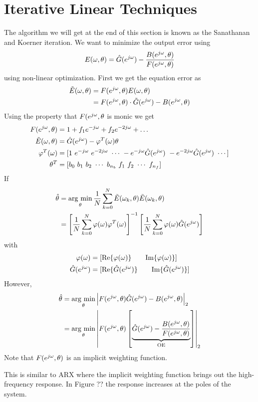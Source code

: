 \section{Iterative Linear Techniques}
The algorithm we will get at the end of this section is known as the Sanathanan and Koerner iteration. We want to minimize the output error using
$$E(\omega,\theta) = \hat{G}(e^{j\omega}) - \frac{B(e^{j\omega},\theta)}{F(e^{j\omega},\theta)}$$
using non-linear optimization. First we get the equation error as
\begin{align*}
\tilde{E}(\omega,\theta) &= F(e^{j\omega},\theta)E(\omega,\theta) \\
&= F(e^{j\omega},\theta)\cdot\tilde{G}(e^{j\omega}) - B(e^{j\omega},\theta)
\end{align*}
Using the property that $F(e^{j\omega},\theta$ is monic we get
\begin{align*}
F(e^{j\omega},\theta) &= 1 + f_1e^{-j\omega} + f_2e^{-2j\omega} + \ldots \\
\tilde{E}(\omega,\theta) &= \hat{G}(e^{j\omega}) - \varphi^T(\omega)\theta \\
\varphi^T(\omega) &= [1 ~ e^{-j\omega} ~ e^{-2j\omega} ~ \cdots ~ -e^{-j\omega}\hat{G}(e^{j\omega}) ~ -e^{-2j\omega}\hat{G}(e^{j\omega}) ~ \cdots] \\
\theta^T &= [b_0 ~ b_1 ~ b_2 ~ \cdots ~ b_{n_b} ~ f_1 ~ f_2 ~ \cdots ~ f_{n_f}]
\end{align*}
If
\begin{align*}
\hat{\theta} &= \mathop{\arg\,\min}\limits_\theta \frac{1}{N}\sum_{k=0}^N\tilde{E}(\omega_k,\theta)\tilde{E}(\omega_k,\theta) \\
&= \left[\frac{1}{N}\sum_{k=0}^N\varphi(\omega)\varphi^T(\omega)\right]^{-1}\left[\frac{1}{N}\sum_{k=0}^N\varphi(\omega)\hat{G}(e^{j\omega})\right]
\end{align*}
with
\begin{align*}
\varphi(\omega) &= [\text{Re}\{\varphi(\omega)\} \qquad \text{Im}\{\varphi(\omega)\}] \\
\hat{G}(e^{j\omega}) &= [\text{Re}\{\hat{G}(e^{j\omega})\} \qquad \text{Im}\{\hat{G}(e^{j\omega})\}]
\end{align*}
However,
\begin{align*}
\hat{\theta} &= \mathop{\arg\,\min}\limits_\theta \left|F(e^{j\omega},\theta)\hat{G}(e^{j\omega}) - B(e^{j\omega},\theta)\right|_2 \\
&= \mathop{\arg\,\min}\limits_\theta \left|F(e^{j\omega},\theta)\left[\underbrace{\hat{G}(e^{j\omega}) - \frac{B(e^{j\omega},\theta)}{F(e^{j\omega},\theta)}}_{\text{OE}}\right]\right|_2
\end{align*}
Note that $F(e^{j\omega},\theta)$ is an implicit weighting function.

This is similar to ARX where the implicit weighting function brings out the high-frequency response. In Figure ?? the response increases at the poles of the system.

